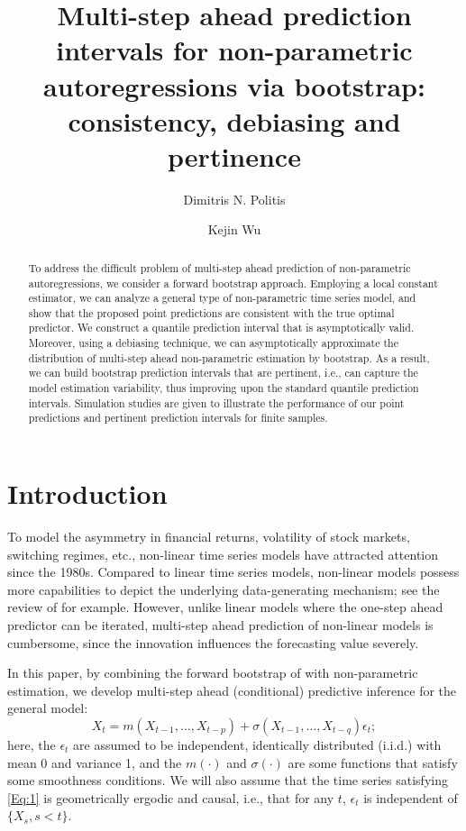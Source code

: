 \documentclass[a4paper]{article}
\title{Multi-step ahead prediction intervals for non-parametric 
autoregressions via bootstrap: consistency, debiasing and pertinence }
\author[1]{Dimitris N. Politis}
\author[2]{Kejin Wu}
\affil[1]{Department of Mathematics and Halicio\u{g}lu Data Science Institute, University of California, San Diego}
\affil[2]{Department of Mathematics, University of California, San Diego }
\date{}
\begin{document}
\maketitle

\begin{abstract}
To address the difficult problem  of multi-step ahead prediction
of non-parametric autoregressions, we consider a  forward bootstrap approach.  
Employing a local constant estimator,  we can analyze a general type of 
non-parametric time series model, and show that the proposed point predictions are consistent with the true optimal predictor. We construct a quantile prediction interval that is asymptotically valid. Moreover, using a debiasing technique, we can asymptotically approximate the distribution of multi-step ahead non-parametric estimation by bootstrap. As a result, we can build bootstrap prediction intervals that are pertinent, i.e., 
  can capture the model estimation variability, thus improving 
upon the standard quantile prediction intervals.
 Simulation studies are given to illustrate the performance of our point predictions and pertinent prediction intervals for finite samples.
\end{abstract}

\section{Introduction}\label{Sec:Intro}
To model the asymmetry in financial returns, volatility of stock markets,  switching regimes, etc.,   non-linear time series models have attracted 
attention since the 1980s. Compared to linear time series models, non-linear models possess more capabilities to depict the underlying data-generating mechanism; %
 see the review of \cite{politis2009financial} for example. However, unlike linear models where the one-step ahead predictor can be iterated,
multi-step ahead prediction of non-linear models is cumbersome, since the innovation influences the forecasting value severely.

 In this paper, by combining the forward bootstrap 
of \cite{politis2015model} with non-parametric estimation, we develop 
multi-step ahead (conditional) predictive inference for the 
general model:
\begin{equation}\label{Eq:1}
    X_t = m(X_{t-1},\ldots, X_{t-p}) + \sigma(X_{t-1},\ldots, X_{t-q})\epsilon_t;
\end{equation}
 here, the $\epsilon_t$ are assumed to be independent, identically distributed (i.i.d.) with mean 0 and   variance 1, and the $m(\cdot)$ and $\sigma(\cdot)$ are some functions that satisfy some smoothness conditions. 
We will also assume that the time series
  satisfying \cref{Eq:1} is geometrically ergodic  and causal, i.e., 
that for any $t$, $\epsilon_t$ is independent of $\{X_s, s<t\}$. 
\end{document}

